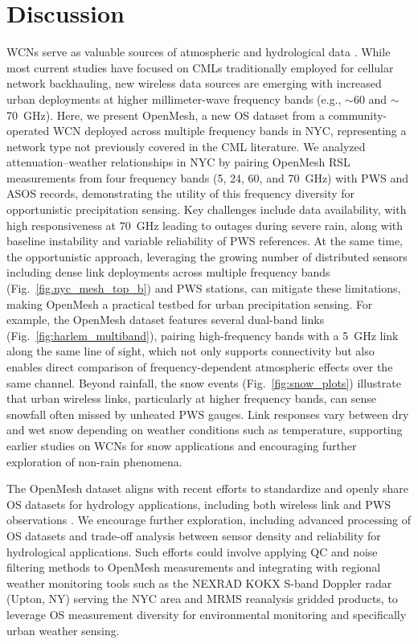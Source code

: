 \documentclass[manuscript]{copernicus}
\begin{document}
\section{Discussion}\label{sec:discussion}
WCNs serve as valuable sources of atmospheric and hydrological data \citep{messer2006environmental,chwala2019commercial,fencl2025new}. While most current studies have focused on CMLs traditionally employed for cellular network backhauling, new wireless data sources are emerging with increased urban deployments at higher millimeter-wave frequency bands (e.g., $\sim$60 and $\sim$70~GHz). Here, we present OpenMesh, a new OS dataset from a community-operated WCN deployed across multiple frequency bands in NYC, representing a network type not previously covered in the CML literature.
We analyzed attenuation--weather relationships in NYC by pairing OpenMesh RSL measurements from four frequency bands (5, 24, 60, and 70~GHz) with PWS and ASOS records, demonstrating the utility of this frequency diversity for opportunistic precipitation sensing.
Key challenges include data availability, with high responsiveness at 70~GHz leading to outages during severe rain, along with baseline instability and variable reliability of PWS references. 
At the same time, the opportunistic approach, leveraging the growing number of distributed sensors including dense link deployments across multiple frequency bands (Fig.~\ref{fig.nyc_mesh_top_b}) and PWS stations, can mitigate these limitations, making OpenMesh a practical testbed for urban precipitation sensing.
For example, the OpenMesh dataset features several dual-band links (Fig.~\ref{fig:harlem_multiband}), pairing high-frequency bands with a 5~GHz link along the same line of sight, which not only supports connectivity but also enables direct comparison of frequency-dependent atmospheric effects over the same channel.
Beyond rainfall, the snow events (Fig.~\ref{fig:snow_plots}) illustrate that 
urban wireless links, particularly at higher frequency bands, can sense snowfall 
often missed by unheated PWS gauges. Link responses vary between dry and wet snow 
depending on weather conditions such as temperature, supporting earlier studies 
on WCNs for snow applications \citep{oydvin2023classification,oydvin2024combining} 
and encouraging further exploration of non-rain phenomena.

The OpenMesh dataset aligns with recent efforts to standardize and openly share 
OS datasets for hydrology applications, including both wireless link and PWS 
observations \citep{fencl2025new,fencl2023data}. We encourage further exploration, 
including advanced processing of OS datasets and trade-off analysis between sensor 
density and reliability for hydrological applications. Such efforts could involve 
applying QC and noise filtering methods to OpenMesh measurements and integrating 
with regional weather monitoring tools such as the NEXRAD KOKX S-band Doppler 
radar (Upton, NY) serving the NYC area and MRMS reanalysis gridded products, 
to leverage OS measurement diversity for environmental monitoring and specifically 
urban weather sensing.
\end{document}

